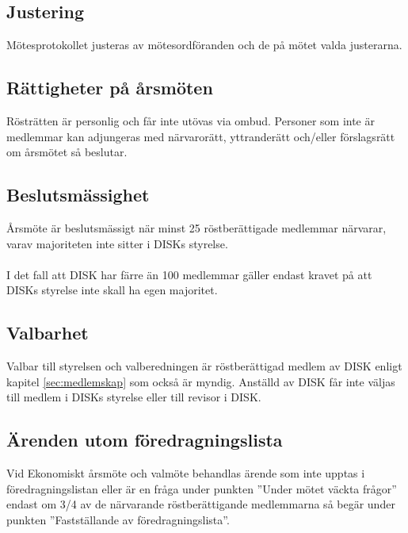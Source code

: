 	\subsection{Justering}
	\label{subsec:justering}
		Mötesprotokollet justeras av mötesordföranden och de på mötet valda justerarna.

	\subsection{Rättigheter på årsmöten}
	\label{subsec:rattigheterpaarsmoten}
		Rösträtten är personlig och får inte utövas via ombud. Personer som inte är medlemmar kan adjungeras med närvarorätt, yttranderätt och/eller förslagsrätt om årsmötet så beslutar.

	\subsection{Beslutsmässighet}
	\label{subsec:beslutsmassighet}
		Årsmöte är beslutsmässigt när minst 25 röstberättigade medlemmar närvarar, varav majoriteten inte sitter i DISKs styrelse.\\ \\
		I det fall att DISK har färre än 100 medlemmar gäller endast kravet på att DISKs styrelse inte skall ha egen majoritet.

	\subsection{Valbarhet}
	\label{subsec:valbarhet}
		Valbar till styrelsen och valberedningen är röstberättigad medlem av DISK enligt kapitel \ref{sec:medlemskap} som också är myndig. Anställd av DISK får inte väljas till medlem i DISKs styrelse eller till revisor i DISK.

	\subsection{Ärenden utom föredragningslista}
	\label{subsec:arendenutomforedragningslista}
		Vid Ekonomiskt årsmöte och valmöte behandlas ärende som inte upptas i föredragningslistan eller är en fråga under punkten ”Under mötet väckta frågor” endast om 3/4 av de närvarande röstberättigande medlemmarna så begär under punkten ”Fastställande av föredragningslista”.

